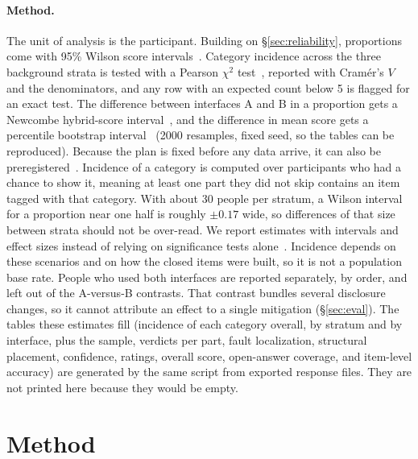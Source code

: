\documentclass[sigconf]{acmart}
\begin{document}
\paragraph{Method.}
The unit of analysis is the participant. Building on \S\ref{sec:reliability}, proportions come with 95\% Wilson score intervals~\cite{wilson1927probable}. Category incidence across the three background strata is tested with a Pearson $\chi^2$ test~\cite{pearson1900criterion}, reported with Cram\'er's $V$~\cite{cramer1946mathematical} and the denominators, and any row with an expected count below 5 is flagged for an exact test. The difference between interfaces A and B in a proportion gets a Newcombe hybrid-score interval~\cite{newcombe1998interval}, and the difference in mean score gets a percentile bootstrap interval~\cite{efron1979bootstrap} (2000 resamples, fixed seed, so the tables can be reproduced). Because the plan is fixed before any data arrive, it can also be preregistered~\cite{cockburn2018hark}. Incidence of a category is computed over participants who had a chance to show it, meaning at least one part they did not skip contains an item tagged with that category. With about 30 people per stratum, a Wilson interval for a proportion near one half is roughly $\pm 0.17$ wide, so differences of that size between strata should not be over-read. We report estimates with intervals and effect sizes instead of relying on significance tests alone~\cite{dragicevic2016fair}. Incidence depends on these scenarios and on how the closed items were built, so it is not a population base rate. People who used both interfaces are reported separately, by order, and left out of the A-versus-B contrasts. That contrast bundles several disclosure changes, so it cannot attribute an effect to a single mitigation (\S\ref{sec:eval}). The tables these estimates fill (incidence of each category overall, by stratum and by interface, plus the sample, verdicts per part, fault localization, structural placement, confidence, ratings, overall score, open-answer coverage, and item-level accuracy) are generated by the same script from exported response files. They are not printed here because they would be empty.

\section{Method}\label{sec:design}
\end{document}
